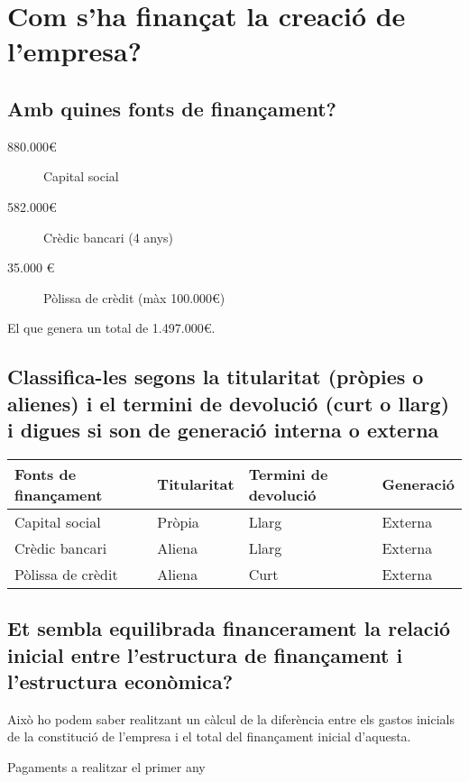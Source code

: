 \section{Com s’ha finançat la creació de l’empresa?}

\subsection{Amb quines fonts de finançament?}

\begin{description}
  \item[880.000€] Capital social
  \item[582.000€] Crèdic bancari (4 anys)
  \item[35.000 €] Pòlissa de crèdit (màx 100.000€)
\end{description}

El que genera un total de 1.497.000€.

\subsection{Classifica-les segons la
titularitat (pròpies o alienes) i el termini de devolució (curt o llarg) i
digues si son de generació interna o externa}

\begin{tabular}{| l | l | l | l |}
  \hline
  \textbf{Fonts de finançament} & \textbf{Titularitat} & 
  \textbf{Termini de devolució} & \textbf{Generació} \\
  \hline
  Capital social & Pròpia & Llarg & Externa \\
  \hline
  Crèdic bancari & Aliena & Llarg & Externa \\
  \hline
  Pòlissa de crèdit & Aliena & Curt & Externa\\
  \hline
\end{tabular}

\subsection{Et sembla equilibrada financerament la relació inicial entre 
l’estructura de finançament i l’estructura econòmica?}

Això ho podem saber realitzant un càlcul de la diferència entre els gastos
inicials de la constitució de l'empresa i el total del finançament inicial 
d'aquesta.

Pagaments a realitzar el primer any \\

